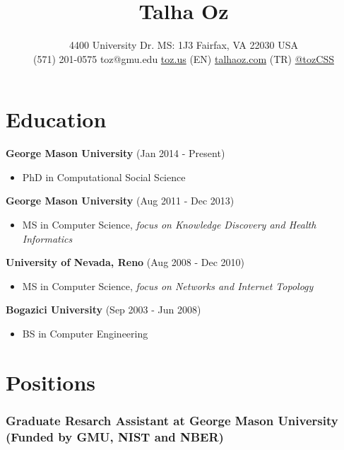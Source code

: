 \documentclass[11pt, letter]{article}
\title{Talha Oz}
\author{4400 University Dr. MS: 1J3 Fairfax, VA 22030 USA\\ 
(571) 201-0575 \textbar{} toz@gmu.edu \textbar{}
\href{http://toz.us}{toz.us} (EN) \textbar{}
\href{http://talhaoz.com}{talhaoz.com} (TR) \textbar{}
\href{http://twitter.com/tozCSS}{@tozCSS} }
\date{} %
\begin{document}
\maketitle
\begin{raggedright}
\vspace{-15mm}


\section{Education}\label{education}

\textbf{George Mason University} (Jan 2014 - Present)

\begin{itemize}
\itemsep1pt\parskip0pt
\item
  PhD in Computational Social Science
\end{itemize}

\textbf{George Mason University} (Aug 2011 - Dec 2013)

\begin{itemize}
\itemsep1pt\parskip0pt
\item
  MS in Computer Science, \emph{focus on Knowledge Discovery and Health
  Informatics}
\end{itemize}

\textbf{University of Nevada, Reno} (Aug 2008 - Dec 2010)

\begin{itemize}
\itemsep1pt\parskip0pt
\item
  MS in Computer Science, \emph{focus on Networks and Internet Topology}
\end{itemize}

\textbf{Bogazici University} (Sep 2003 - Jun 2008)

\begin{itemize}
\itemsep1pt\parskip0pt
\item
  BS in Computer Engineering
\end{itemize}

\section{Positions}\label{positions}

\subsubsection{Graduate Resarch Assistant at George Mason University
(Funded by GMU, NIST and
NBER)}\label{graduate-resarch-assistant-at-george-mason-university-funded-by-gmu-nist-and-nber}


\end{raggedright}
\end{document}
